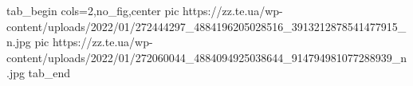  
 
 
 
 


\ifcmt
  tab_begin cols=2,no_fig,center
     pic https://zz.te.ua/wp-content/uploads/2022/01/272444297_4884196205028516_3913212878541477915_n.jpg
		 pic https://zz.te.ua/wp-content/uploads/2022/01/272060044_4884094925038644_914794981077288939_n.jpg
  tab_end
\fi
